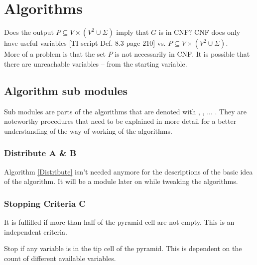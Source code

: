 
\section{Algorithms}\label{algorithms}

\noindent Does the output $P \subseteq V \times (V^{2} \cup \Sigma)$ imply that $G$ is in CNF? CNF does only have useful variables [TI script Def. 8.3 page 210] vs. $P \subseteq V \times (V^{2} \cup \Sigma)$.\\
\noindent More of a problem is that the set $P$ is not necessarily in CNF. It is possible that there are unreachable variables -- from the starting variable.

\subsection{Algorithm sub modules}
Sub modules are parts of the algorithms that are denoted with , , ... . They are noteworthy procedures that need to be explained in more detail for a better understanding of the way of working of the algorithms.
\subsubsection{Distribute A \& B}
\noindent
{}
Algorithm \ref{Distribute} isn't needed anymore for the descriptions of the basic idea of the algorithm. It will be a module later on while tweaking the algorithms.

\subsubsection{Stopping Criteria C}
It is fulfilled if more than half of the pyramid cell are not empty. This is an independent criteria.

Stop if any variable is in the tip cell of the pyramid. This is dependent on the count of different available variables. 


